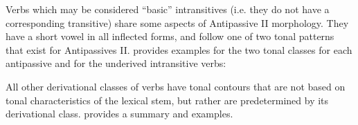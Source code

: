 \documentclass[output=paper,newtxmath,modfonts,nonflat,draftmode]{langsci/langscibook}
\begin{document}
Verbs which may be considered “basic” intransitives (i.e. they do not have a corresponding transitive) share some aspects of Antipassive II morphology. They have a short vowel in all inflected forms, and follow one of two tonal patterns that exist for Antipassives II.  provides examples for the two tonal classes for each antipassive and for the underived intransitive verbs:


\begin{table}
\caption{Examples of tonal classes of Antipassives and Intransitives (Eastern Nuer)}
\label{tab:monich:14}
\end{table}

All other derivational classes of verbs have tonal contours that are not based on tonal characteristics of the lexical stem, but rather are predetermined by its derivational class.  provides a summary and examples.
\end{document}
